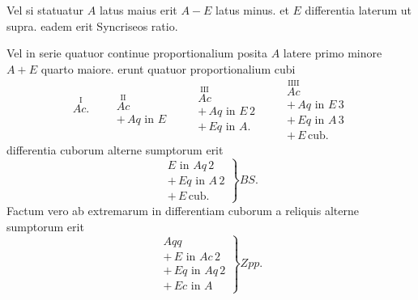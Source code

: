 \documentclass[11pt,a4paper]{article}
\begin{document}
Vel si statuatur $A$ latus maius erit $A - E$ latus minus. et $E$ differentia laterum ut supra. eadem erit Syncriseos ratio.

Vel in serie quatuor continue proportionalium posita $A$ latere primo minore  $A + E$ quarto maiore. erunt quatuor proportionalium cubi
\[ \overset{\text{I}}{Ac.} \qquad \begin{array}{l} \overset{\text{II}}{Ac} \\ +\,Aq \text{ in } E \end{array} \qquad \begin{array}{l} \overset{\text{III}}{Ac} \\ +\,Aq \text{ in } E\,2 \\ +\,Eq \text{ in } A. \end{array} \qquad \begin{array}{l} \overset{\text{IIII}}{Ac} \\ +\,Aq \text{ in } E\,3 \\ +\,Eq \text{ in } A\,3 \\ +\,E\,\text{cub.} \end{array} \]
differentia cuborum alterne sumptorum erit
\[ \left.\begin{array}{l} E \text{ in } Aq\,2 \\ +\,Eq \text{ in } A\,2 \\ +\,E\,\text{cub.} \end{array}\right\} BS. \]
Factum vero ab  extremarum in differentiam cuborum a reliquis alterne sumptorum erit
\[ \left.\begin{array}{l} Aqq \\ +\,E \text{ in } Ac\,2 \\ +\,Eq \text{ in } Aq\,2 \\ +\,Ec \text{ in } A \end{array}\right\} Zpp. \]

\end{document}
